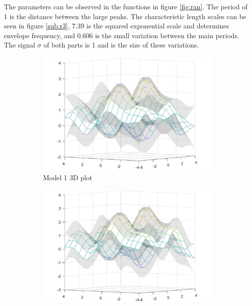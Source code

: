 \documentclass[twoside,twocolumn]{article}
\begin{document}
The parameters can be observed in the functions in figure \ref{fig:ran}. The period of 1 is the distance between the large peaks. The characteristic length scales can be seen in figure \ref{sub:r3}, 7.39 is the squared exponential scale and determines envelope frequency, and 0.606 is the small variation between the main periods. The signal $\sigma$ of both parts is 1 and is the size of these variations.

\begin{figure}[h]
\centering
    \begin{subfigure}[t]{0.49\linewidth}
        \centering
        \includegraphics[width=\textwidth]{c_1_5_1}
        \caption{Model 1 3D plot}
        \label{sub:2d1}
    \end{subfigure}%
    \begin{subfigure}[t]{0.49\linewidth}
        \centering
        \includegraphics[width=\textwidth]{c_1_5_2}

\end{subfigure}
\end{figure}
\end{document}
